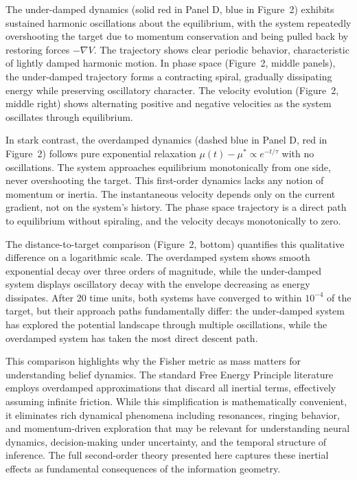 \documentclass[11pt]{article}
\begin{document}
The under-damped dynamics (solid red in Panel D, blue in Figure~2) exhibits sustained harmonic oscillations about the equilibrium, with the system repeatedly overshooting the target due to momentum conservation and being pulled back by restoring forces $-\nabla V$. The trajectory shows clear periodic behavior, characteristic of lightly damped harmonic motion. In phase space (Figure~2, middle panels), the under-damped trajectory forms a contracting spiral, gradually dissipating energy while preserving oscillatory character. The velocity evolution (Figure~2, middle right) shows alternating positive and negative velocities as the system oscillates through equilibrium.

In stark contrast, the overdamped dynamics (dashed blue in Panel D, red in Figure~2) follows pure exponential relaxation $\mu(t) - \mu^* \propto e^{-t/\tau}$ with no oscillations. The system approaches equilibrium monotonically from one side, never overshooting the target. This first-order dynamics lacks any notion of momentum or inertia. The instantaneous velocity depends only on the current gradient, not on the system's history. The phase space trajectory is a direct path to equilibrium without spiraling, and the velocity decays monotonically to zero.

The distance-to-target comparison (Figure~2, bottom) quantifies this qualitative difference on a logarithmic scale. The overdamped system shows smooth exponential decay over three orders of magnitude, while the under-damped system displays oscillatory decay with the envelope decreasing as energy dissipates. After 20 time units, both systems have converged to within $10^{-4}$ of the target, but their approach paths fundamentally differ: the under-damped system has explored the potential landscape through multiple oscillations, while the overdamped system has taken the most direct descent path.

This comparison highlights why the Fisher metric as mass matters for understanding belief dynamics. The standard Free Energy Principle literature employs overdamped approximations that discard all inertial terms, effectively assuming infinite friction. While this simplification is mathematically convenient, it eliminates rich dynamical phenomena including resonances, ringing behavior, and momentum-driven exploration that may be relevant for understanding neural dynamics, decision-making under uncertainty, and the temporal structure of inference. The full second-order theory presented here captures these inertial effects as fundamental consequences of the information geometry.
\end{document}
